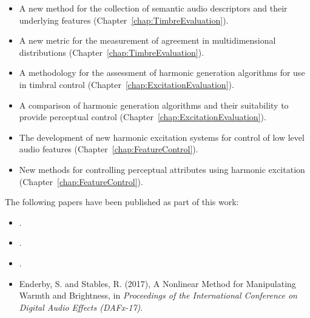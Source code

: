 	\begin{itemize}
		\item A new method for the collection of semantic audio descriptors and their underlying features
		      (Chapter~\ref{chap:TimbreEvaluation}).
		\item A new metric for the measurement of agreement in multidimensional distributions
		      (Chapter~\ref{chap:TimbreEvaluation}).
		\item A methodology for the assessment of harmonic generation algorithms for use in timbral control
		      (Chapter~\ref{chap:ExcitationEvaluation}).
		\item A comparison of harmonic generation algorithms and their suitability to provide perceptual control
		      (Chapter~\ref{chap:ExcitationEvaluation}).
		\item The development of new harmonic excitation systems for control of low level audio features
		      (Chapter~\ref{chap:FeatureControl}).
		\item New methods for controlling perceptual attributes using harmonic excitation
		      (Chapter~\ref{chap:FeatureControl}).
	\end{itemize}

	The following papers have been published as part of this work:

	\begin{itemize}
		\item {}.
		\item {}.
		\item {}.
		\item Enderby, S. and Stables, R. (2017), A Nonlinear Method for Manipulating Warmth and Brightness, in
		      \emph{Proceedings of the International Conference on Digital Audio Effects (DAFx-17)}.
	\end{itemize}
